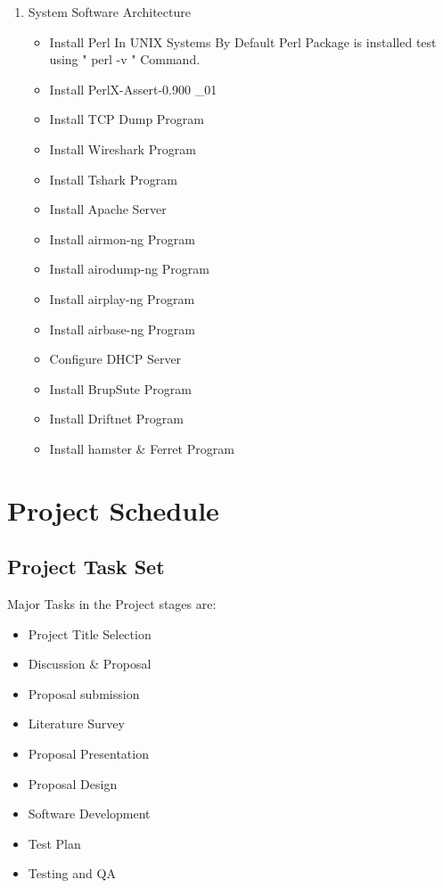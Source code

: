 \documentclass[12pt,a4paper]{report}
\begin{document}
\begin{itemize}
\begin{itemize}
\begin{enumerate}
\begin{enumerate}
							   \item System Software Architecture 
							   		\begin{itemize}
							   			\item	Install Perl In UNIX Systems By Default 													Perl Package is installed test using " 														perl -v " Command. 
										\item	Install PerlX-Assert-0.900 \_01 
										\item	Install TCP Dump Program 
										\item	Install Wireshark Program 
										\item	Install Tshark Program
										\item	Install Apache Server 
										\item	Install airmon-ng Program 
										\item	Install airodump-ng Program
										\item	Install airplay-ng Program 
										\item	Install airbase-ng Program 
										\item	Configure DHCP Server 
										\item	Install BrupSute Program 
										\item	Install Driftnet Program 
										\item	Install hamster \& Ferret Program 
							   		\end{itemize}
							\end{enumerate}
			\end{enumerate}		     
     	\end{itemize} 
\end{itemize}
\vspace{3cm}
\section{Project Schedule}
\subsection{Project Task Set}
Major Tasks in the Project stages are:
\begin{itemize}
\item	Project Title Selection
\item	Discussion \& Proposal
\item	Proposal submission
\item	Literature Survey
\item	Proposal Presentation
\item	Proposal Design
\item	Software Development
\item	Test Plan
\item	Testing and QA
\end{itemize}
\end{document}
